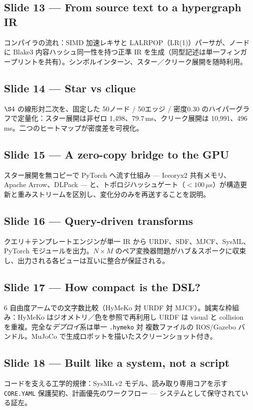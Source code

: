 \documentclass[10pt]{article}
\begin{document}
\subsection*{Slide 13 --- From source text to a hypergraph IR}
コンパイラの流れ：SIMD 加速レキサと LALRPOP（LR(1)）パーサが、ノードに Blake3 内容ハッシュ同一性を持つ正準 IR を生成（同型記述は単一フィンガープリントを共有）。シンボルインターン、スター／クリーク展開を随時利用。

\subsection*{Slide 14 --- Star vs clique}
$\S4$ の線形対二次を、固定した 50ノード / 50エッジ / 密度0.30 のハイパーグラフで定量化：スター展開は非ゼロ 1{,}498、79.7\,ms、クリーク展開は 10{,}991、496\,ms。二つのヒートマップが密度差を可視化。

\subsection*{Slide 15 --- A zero-copy bridge to the GPU}
スター展開を無コピーで PyTorch へ流す仕組み --- Iceoryx2 共有メモリ、Apache Arrow、DLPack --- と、トポロジハッシュゲート（$<100\,\mu$s）が構造更新と重みストリームを区別し、変化分のみを再送することを説明。

\subsection*{Slide 16 --- Query-driven transforms}
クエリ＋テンプレートエンジンが単一 IR から URDF、SDF、MJCF、SysML、PyTorch モジュールを出力。$N\times M$ のペア変換器問題がハブ＆スポークに収束し、出力される各ビューは互いに整合が保証される。

\subsection*{Slide 17 --- How compact is the DSL?}
6 自由度アームでの文字数比較（HyMeKo 対 URDF 対 MJCF）。誠実な枠組み：HyMeKo はジオメトリ／色を参照で再利用し URDF は visual と collision を重複。完全な\emph{デプロイ}系は単一 \texttt{.hymeko} 対 複数ファイルの ROS/Gazebo バンドル。MuJoCo で生成ロボットを描いたスクリーンショット付き。

\subsection*{Slide 18 --- Built like a system, not a script}
コードを支える工学的規律：SysML\,v2 モデル、読み取り専用コアを示す \texttt{CORE.YAML} 保護契約、計画優先のワークフロー --- システムとして保守されている証左。
\end{document}
